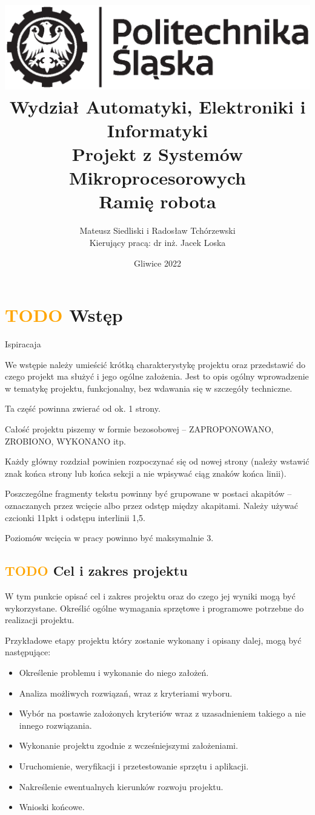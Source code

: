 \documentclass[11pt,titlepage]{article}
\title{
\includegraphics[scale=0.75]{img/politechnika_sl_logo_bw_poziom_pl.eps}\\
\textbf{
Wydział Automatyki, Elektroniki i Informatyki}\\
\vspace*{1cm}
Projekt z Systemów Mikroprocesorowych\\
Ramię robota\\
}
\author{Mateusz Siedliski i Radosław Tchórzewski\\
Kierujący pracą: dr inż. Jacek Loska}
\date{Gliwice 2022}
\begin{document}
\maketitle

\tableofcontents

\newpage

\section{\textcolor{orange}{TODO} Wstęp}

Ispiracaja\cite*{HTM_YT}

We wstępie należy umieścić krótką charakterystykę projektu oraz przedstawić do czego projekt ma służyć i jego ogólne założenia. Jest to opis ogólny wprowadzenie w tematykę projektu, funkcjonalny, bez wdawania się w szczegóły techniczne.

Ta część powinna zwierać od ok. 1 strony.

Całość projektu piszemy w formie bezosobowej – ZAPROPONOWANO, ZROBIONO, WYKONANO itp.

Każdy główny rozdział powinien rozpoczynać się od nowej strony (należy wstawić znak końca strony lub końca sekcji a nie wpisywać ciąg znaków końca linii).

Poszczególne fragmenty tekstu powinny być grupowane w postaci akapitów – oznaczanych przez wcięcie albo przez odstęp między akapitami. Należy używać czcionki 11pkt i odstępu interlinii 1,5.

Poziomów wcięcia w pracy powinno być maksymalnie 3.

\subsection{\textcolor{orange}{TODO} Cel i zakres projektu}

W tym punkcie opisać cel i zakres projektu oraz do czego jej wyniki mogą być wykorzystane. Określić ogólne wymagania sprzętowe i programowe potrzebne do realizacji projektu.

Przykładowe etapy projektu który zostanie wykonany i opisany dalej, mogą być następujące:
\begin{itemize}
    \item Określenie problemu i wykonanie do niego założeń.
    \item Analiza możliwych rozwiązań, wraz z kryteriami wyboru.
    \item Wybór na postawie założonych kryteriów wraz z uzasadnieniem takiego a nie innego rozwiązania.
    \item Wykonanie projektu zgodnie z wcześniejszymi założeniami.
    \item Uruchomienie, weryfikacji i przetestowanie sprzętu i aplikacji.
    \item Nakreślenie ewentualnych kierunków rozwoju projektu.
    \item Wnioski końcowe.
\end{itemize}
\end{document}
